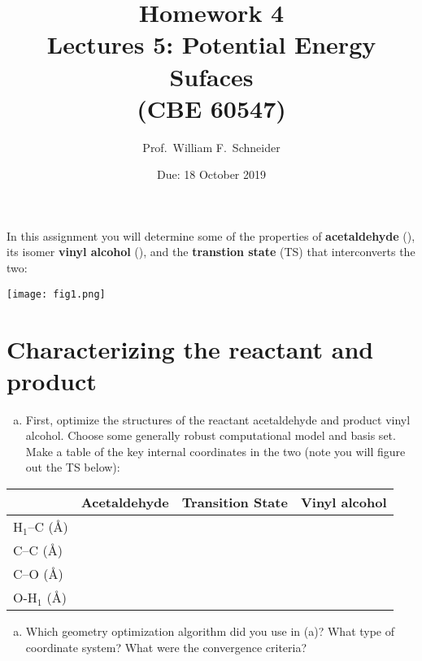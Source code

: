 \documentclass[11pt]{article}
\date{Due: 18 October 2019}
\title{}
\begin{document}
\title{Homework 4\\Lectures 5: Potential Energy Sufaces\\(CBE 60547)}
\author{Prof.\ William F.\ Schneider}
\maketitle

In this assignment you will determine some of the properties of \textbf{acetaldehyde} (), its isomer \textbf{vinyl alcohol} (), and the \textbf{transtion state} (TS) that interconverts the two:

\begin{center}
\begin{center}
\texttt{[image: fig1.png]}
\end{center}
\end{center}



\section{Characterizing the reactant and product}
\label{sec:org5834fb8}
\begin{enumerate}[(a)]
\item First, optimize the structures of the reactant acetaldehyde and product vinyl alcohol.  Choose some generally robust computational model and basis set.  Make a table of the key internal coordinates in the two (note you will figure out the TS below):
\end{enumerate}

\begin{center}
\begin{tabular}{llll}
\hline
 & Acetaldehyde & Transition State & Vinyl alcohol\\
\hline
H\(_{\text{1}}\)–C (\AA{}) &  &  & \\
C–C (\AA{}) &  &  & \\
C–O (\AA{}) &  &  & \\
O-H\(_{\text{1}}\) (\AA{}) &  &  & \\
\hline
\end{tabular}
\end{center}

\begin{enumerate}[(b)]
\item Which geometry optimization algorithm did you use in (a)? What type of coordinate system? What were the convergence criteria?
\end{enumerate}
\end{document}
